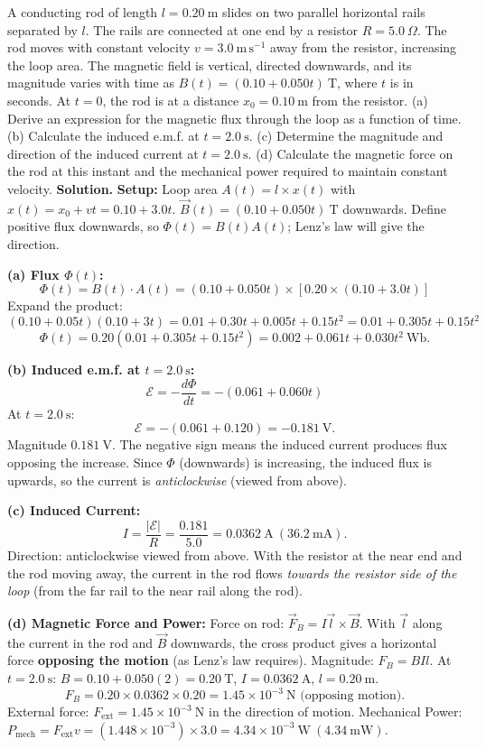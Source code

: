 \documentclass[11pt]{article}
\begin{document}
\begin{exoresolu}
A conducting rod of length $l = 0.20\ \mathrm{m}$ slides on two parallel horizontal rails separated by $l$. The rails are connected at one end by a resistor $R = 5.0\ \Omega$. The rod moves with constant velocity $v = 3.0\ \mathrm{m\,s^{-1}}$ away from the resistor, increasing the loop area. The magnetic field is vertical, directed downwards, and its magnitude varies with time as $B(t) = (0.10 + 0.050 t)\ \mathrm{T}$, where $t$ is in seconds. At $t = 0$, the rod is at a distance $x_0 = 0.10\ \mathrm{m}$ from the resistor. (a) Derive an expression for the magnetic flux through the loop as a function of time. (b) Calculate the induced e.m.f. at $t = 2.0\ \mathrm{s}$. (c) Determine the magnitude and direction of the induced current at $t = 2.0\ \mathrm{s}$. (d) Calculate the magnetic force on the rod at this instant and the mechanical power required to maintain constant velocity.
\tcblower
\textbf{Solution.}
\textbf{Setup:} Loop area $A(t) = l \times x(t)$ with $x(t) = x_0 + vt = 0.10 + 3.0t$.
$\vec{B}(t) = (0.10 + 0.050t)\ \mathrm{T}$ downwards. Define positive flux downwards, so $\Phi(t) = B(t)A(t)$; Lenz's law will give the direction.

\textbf{(a) Flux $\Phi(t)$:}
\[
\Phi(t) = B(t) \cdot A(t) = (0.10 + 0.050t) \times [0.20 \times (0.10 + 3.0t)]
\]
Expand the product:
\[
(0.10 + 0.05t)(0.10 + 3t) = 0.01 + 0.30t + 0.005t + 0.15t^2 = 0.01 + 0.305t + 0.15t^2
\]
\[
\Phi(t) = 0.20(0.01 + 0.305t + 0.15t^2) = \boxed{0.002 + 0.061t + 0.030t^2\ \mathrm{Wb}}.
\]

\textbf{(b) Induced e.m.f. at $t=2.0\ \mathrm{s}$:}
\[
\mathcal{E} = -\frac{d\Phi}{dt} = -(0.061 + 0.060t)
\]
At $t=2.0\ \mathrm{s}$:
\[
\mathcal{E} = -(0.061 + 0.120) = -0.181\ \mathrm{V}.
\]
Magnitude $\boxed{0.181\ \mathrm{V}}$. The negative sign means the induced current produces flux opposing the increase. Since $\Phi$ (downwards) is increasing, the induced flux is upwards, so the current is \emph{anticlockwise} (viewed from above).

\textbf{(c) Induced Current:}
\[
I = \frac{|\mathcal{E}|}{R} = \frac{0.181}{5.0} = \boxed{0.0362\ \mathrm{A}} \ (36.2\ \mathrm{mA}).
\]
Direction: anticlockwise viewed from above. With the resistor at the near end and the rod moving away, the current in the rod flows \emph{towards the resistor side of the loop} (from the far rail to the near rail along the rod).

\textbf{(d) Magnetic Force and Power:}
Force on rod: $\vec{F}_B = I \vec{l} \times \vec{B}$. With $\vec{l}$ along the current in the rod and $\vec{B}$ downwards, the cross product gives a horizontal force \textbf{opposing the motion} (as Lenz's law requires).
Magnitude: $F_B = B I l$.
At $t=2.0\ \mathrm{s}$: $B = 0.10 + 0.050(2) = 0.20\ \mathrm{T}$, $I = 0.0362\ \mathrm{A}$, $l = 0.20\ \mathrm{m}$.
\[
F_B = 0.20 \times 0.0362 \times 0.20 = \boxed{1.45 \times 10^{-3}\ \mathrm{N}} \text{ (opposing motion)}.
\]
External force: $F_{\text{ext}} = \boxed{1.45 \times 10^{-3}\ \mathrm{N}}$ in the direction of motion.
Mechanical Power: $P_{\text{mech}} = F_{\text{ext}} v = (1.448 \times 10^{-3}) \times 3.0 = \boxed{4.34 \times 10^{-3}\ \mathrm{W}} \ (4.34\ \mathrm{mW})$.


\end{exoresolu}
\end{document}
